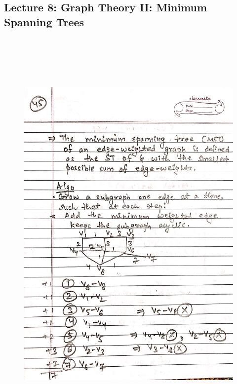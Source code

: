\newpage
{\color{black} \subsection*{Lecture 8: Graph Theory II: Minimum Spanning Trees}}
\begin{figure}[H]
    \centering
    \includegraphics[width=16cm, height=21cm]{"./MIT-6.042J/MIT-6042J-045"}
\end{figure}

